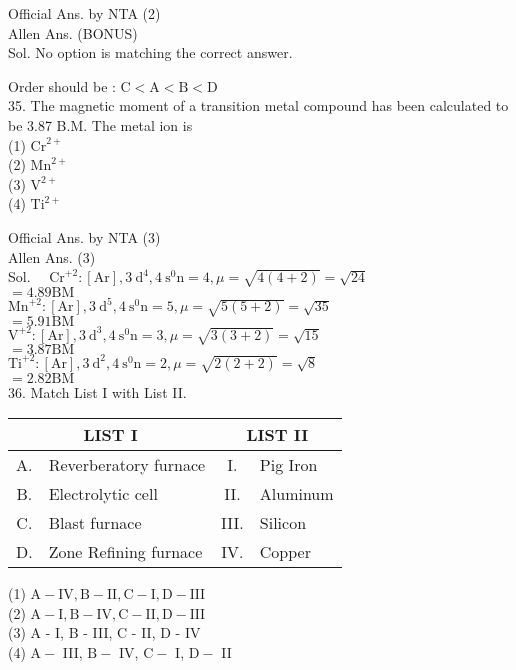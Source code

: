 \documentclass[10pt]{article}
\begin{document}
Official Ans. by NTA (2)\\
Allen Ans. (BONUS)\\
Sol. No option is matching the correct answer.

Order should be : \(\mathrm{C}<\mathrm{A}<\mathrm{B}<\mathrm{D}\)\\
35. The magnetic moment of a transition metal compound has been calculated to be 3.87 B.M. The metal ion is\\
(1) \(\mathrm{Cr}^{2+}\)\\
(2) \(\mathrm{Mn}^{2+}\)\\
(3) \(\mathrm{V}^{2+}\)\\
(4) \(\mathrm{Ti}^{2+}\)

Official Ans. by NTA (3)\\
Allen Ans. (3)\\
Sol. \(\quad \mathrm{Cr}^{+2}:[\mathrm{Ar}], 3 \mathrm{~d}^{4}, 4 \mathrm{~s}^{0} \mathrm{n}=4, \mu=\sqrt{4(4+2)}=\sqrt{24}\)\\
\(=4.89 \mathrm{BM}\)\\
\(\mathrm{Mn}^{+2}:[\mathrm{Ar}], 3 \mathrm{~d}^{5}, 4 \mathrm{~s}^{0} \mathrm{n}=5, \mu=\sqrt{5(5+2)}=\sqrt{35}\)\\
\(=5.91 \mathrm{BM}\)\\
\(\mathrm{V}^{+2}:[\mathrm{Ar}], 3 \mathrm{~d}^{3}, 4 \mathrm{~s}^{0} \mathrm{n}=3, \mu=\sqrt{3(3+2)}=\sqrt{15}\)\\
\(=3.87 \mathrm{BM}\)\\
\(\mathrm{Ti}^{+2}:[\mathrm{Ar}], 3 \mathrm{~d}^{2}, 4 \mathrm{~s}^{0} \mathrm{n}=2, \mu=\sqrt{2(2+2)}=\sqrt{8}\)\\
\(=2.82 \mathrm{BM}\)\\
36. Match List I with List II.

\begin{center}
\begin{tabular}{|c|l|c|l|}
\hline
\multicolumn{2}{|c|}{LIST I} & \multicolumn{2}{c|}{LIST II} \\
\hline
A. & Reverberatory furnace & I. & Pig Iron \\
\hline
B. & Electrolytic cell & II. & Aluminum \\
\hline
C. & Blast furnace & III. & Silicon \\
\hline
D. & Zone Refining furnace & IV. & Copper \\
\hline
\end{tabular}
\end{center}

(1) \(\mathrm{A}-\mathrm{IV}, \mathrm{B}-\mathrm{II}, \mathrm{C}-\mathrm{I}, \mathrm{D}-\mathrm{III}\)\\
(2) \(\mathrm{A}-\mathrm{I}, \mathrm{B}-\mathrm{IV}, \mathrm{C}-\mathrm{II}, \mathrm{D}-\mathrm{III}\)\\
(3) A - I, B - III, C - II, D - IV\\
(4) \(\mathrm{A}-\) III, \(\mathrm{B}-\) IV, \(\mathrm{C}-\) I, \(\mathrm{D}-\) II
\end{document}
